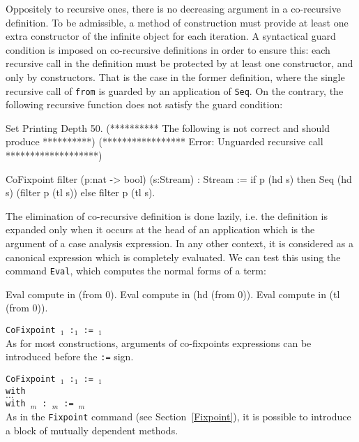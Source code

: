 Oppositely to recursive ones, there is no decreasing argument in a
co-recursive definition. To be admissible, a method of construction
must provide at least one extra constructor of the infinite object for
each iteration. A syntactical guard condition is imposed on
co-recursive definitions in order to ensure this: each recursive call
in the definition must be protected by at least one constructor, and
only by constructors. That is the case in the former definition, where
the single recursive call of \texttt{from} is guarded by an
application of \texttt{Seq}. On the contrary, the following recursive
function does not satisfy the guard condition:

\begin{coq_eval}
Set Printing Depth 50.
(********** The following is not correct and should produce **********)
(***************** Error: Unguarded recursive call *******************)
\end{coq_eval}
\begin{coq_example}
CoFixpoint filter (p:nat -> bool) (s:Stream) : Stream :=
  if p (hd s) then Seq (hd s) (filter p (tl s)) else filter p (tl s).
\end{coq_example}

The elimination of co-recursive definition is done lazily, i.e. the
definition is expanded only when it occurs at the head of an
application which is the argument of a case analysis expression.  In
any other context, it is considered as a canonical expression which is
completely evaluated. We can test this using the command
\texttt{Eval}, which computes the normal forms of a term:

\begin{coq_example}
Eval compute in (from 0).
Eval compute in (hd (from 0)).
Eval compute in (tl (from 0)).
\end{coq_example}

\begin{Variants}
\item{\tt CoFixpoint {\ident$_1$} {\params} :{\type$_1$} :=
  {\term$_1$}}\\ As for most constructions, arguments of co-fixpoints
  expressions can be introduced before the {\tt :=} sign.
\item{\tt CoFixpoint {\ident$_1$} :{\type$_1$} := {\term$_1$}\\
     with\\
        \mbox{}\hspace{0.1cm} $\ldots$  \\
        with {\ident$_m$}   : {\type$_m$} := {\term$_m$}}\\
As in the \texttt{Fixpoint} command (see Section~\ref{Fixpoint}), it
is possible to introduce a block of mutually dependent methods.
\end{Variants}

